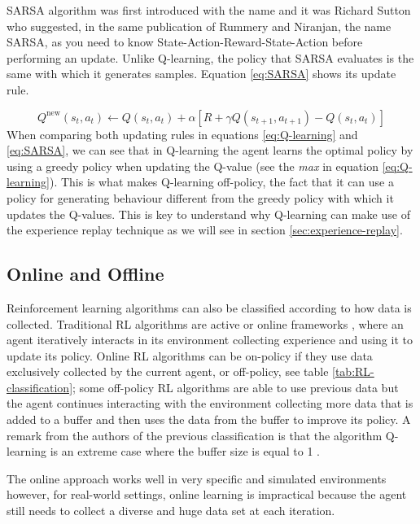 SARSA algorithm was first introduced \cite{Rummery+Niranjan:1994} with the name  and it was Richard Sutton who suggested, in the same publication of Rummery and Niranjan, the name SARSA, as you need to know State-Action-Reward-State-Action before performing an update.  Unlike Q-learning, the policy that SARSA evaluates is the same with which it generates samples. Equation \ref{eq:SARSA} shows its update rule.

\begin{equation}
Q^{\text{new}}(s_t, a_t)  \leftarrow Q(s_t, a_t) + \alpha \left[R+ \gamma  Q(s_{t+1}, a_{t+1}) - Q(s_t, a_t)\right]
\label{eq:SARSA}
\end{equation}
When comparing both updating rules in equations \ref{eq:Q-learning} and \ref{eq:SARSA}, we can see that in Q-learning the agent learns the optimal policy by using a greedy policy when updating the Q-value (see the \textit{max} in equation \ref{eq:Q-learning}). This is what makes Q-learning off-policy, the fact that it can use a policy for generating behaviour different from the greedy policy with which it updates the Q-values. This is key to understand why Q-learning can make use of the experience replay technique as we will see in section \ref{sec:experience-replay}.



\subsection{Online and Offline} Reinforcement learning algorithms can also be classified according to how data is collected. Traditional RL algorithms are active or online frameworks \cite{youtube_offline_RL}, where an agent iteratively interacts in its environment collecting experience and using it to update its policy. Online RL algorithms can be on-policy if  they use data exclusively collected by the current agent, or off-policy, see table \ref{tab:RL-classification}; some off-policy RL algorithms are able to use previous data but the agent continues interacting with the environment collecting more data that is added to a buffer and then uses the data from the buffer to improve its policy. A remark from the authors of the previous classification is that the algorithm Q-learning is an extreme case where the buffer size is  equal to 1 \cite{Offline-RL-Levine:2020}.

The online approach works well in very specific and  simulated environments however, for real-world settings, online learning is impractical because the agent still needs to collect a diverse and huge data set at each iteration. 

